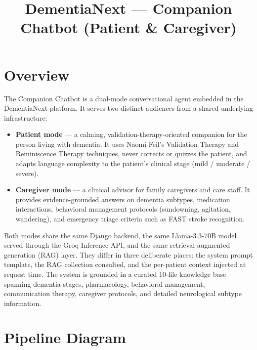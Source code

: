 \documentclass[11pt, a4paper]{article}
\title{\vspace{-2.0cm}\textbf{DementiaNext --- Companion Chatbot (Patient \& Caregiver)}}
\author{}
\date{}
\begin{document}
\maketitle
\vspace{-1.4cm}

\section{Overview}

The Companion Chatbot is a dual-mode conversational agent embedded in the DementiaNext platform. It serves two distinct audiences from a shared underlying infrastructure:

\begin{itemize}
    \item \textbf{Patient mode} --- a calming, validation-therapy-oriented companion for the person living with dementia. It uses Naomi Feil's Validation Therapy and Reminiscence Therapy techniques, never corrects or quizzes the patient, and adapts language complexity to the patient's clinical stage (mild / moderate / severe).
    \item \textbf{Caregiver mode} --- a clinical advisor for family caregivers and care staff. It provides evidence-grounded answers on dementia subtypes, medication interactions, behavioral management protocols (sundowning, agitation, wandering), and emergency triage criteria such as FAST stroke recognition.
\end{itemize}

Both modes share the same Django backend, the same Llama-3.3-70B model served through the Groq Inference API, and the same retrieval-augmented generation (RAG) layer. They differ in three deliberate places: the system prompt template, the RAG collection consulted, and the per-patient context injected at request time. The system is grounded in a curated 10-file knowledge base spanning dementia stages, pharmacology, behavioral management, communication therapy, caregiver protocols, and detailed neurological subtype information.

\section{Pipeline Diagram}
\end{document}
